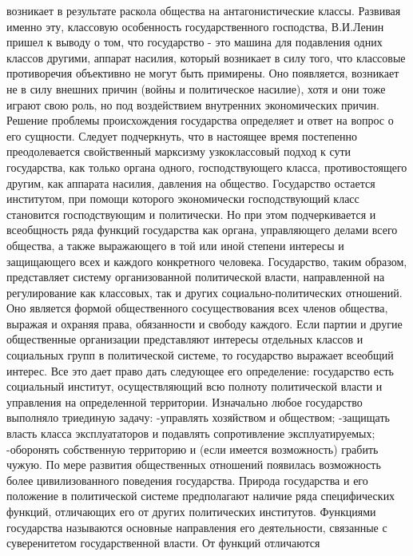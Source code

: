 \documentclass[12pt]{article}
\begin{document}
возникает  в  результате  раскола  общества  на  антагонистические  классы.  Развивая  именно  эту,  классовую
особенность государственного господства, В.И.Ленин пришел к выводу о том, что государство - это машина для
подавления  одних  классов  другими,  аппарат  насилия,  который  возникает  в  силу  того,  что  классовые
противоречия объективно не могут быть примирены. Оно появляется, возникает не в силу внешних причин
(войны  и  политическое  насилие),  хотя  и  они  тоже  играют  свою  роль,  но  под  воздействием  внутренних
экономических причин.
Решение  проблемы  происхождения  государства  определяет  и  ответ  на  вопрос  о  его  сущности.  Следует
подчеркнуть,  что  в  настоящее  время  постепенно  преодолевается  свойственный  марксизму  узкоклассовый
подход к сути государства, как только органа одного, господствующего класса, противостоящего другим, как
аппарата  насилия,  давления  на  общество.  Государство  остается  институтом,  при  помощи  которого
экономически господствующий класс становится господствующим и политически. Но при этом подчеркивается
и  всеобщность  ряда  функций  государства  как  органа,  управляющего  делами  всего  общества,  а  также
выражающего  в  той  или  иной  степени  интересы  и  защищающего  всех  и  каждого  конкретного  человека. 
Государство,  таким  образом,  представляет  систему  организованной  политической  власти,  направленной  на
регулирование  как  классовых,  так  и  других  социально-политических  отношений.  Оно  является  формой
общественного  сосуществования  всех  членов  общества,  выражая  и  охраняя  права,  обязанности  и  свободу
каждого.  Если  партии  и  другие  общественные  организации  представляют  интересы  отдельных  классов  и
социальных групп в политической системе, то государство выражает всеобщий интерес.
Все это дает право дать следующее его определение: государство есть социальный институт, осуществляющий
всю полноту политической власти и управления на определенной территории.
Изначально любое государство выполняло триединую задачу: 
-управлять хозяйством и обществом; 
-защищать власть класса эксплуататоров и подавлять сопротивление эксплуатируемых; 
-оборонять собственную территорию и (если имеется возможность) грабить чужую. 
По  мере  развития  общественных  отношений  появилась  возможность  более  цивилизованного  поведения
государства.
Природа государства и его положение в политической системе предполагают наличие ряда специфических
функций, отличающих его от других политических институтов. Функциями государства называются основные
направления его деятельности, связанные с суверенитетом государственной власти. От функций отличаются
\end{document}
